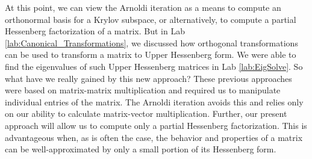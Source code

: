 At this point, we can view the Arnoldi iteration as a means to compute an orthonormal basis for a Krylov subspace, or 
alternatively, to compute a partial Hessenberg factorization of a matrix. 
But in Lab \ref{lab:Canonical_Transformations}, we discussed how orthogonal transformations can be used to transform a matrix to Upper
Hessenberg form.
We were able to find the eigenvalues of such Upper Hessenberg matrices in Lab \ref{lab:EigSolve}.
So what have we really gained by this new approach?
These previous approaches were based on matrix-matrix multiplication and required us to manipulate individual entries of the matrix.
The Arnoldi iteration avoids this and relies only on our ability to calculate matrix-vector multiplication.
Further, our present approach will allow us to compute only a partial Hessenberg factorization. This is advantageous when, as
is often the case, the behavior and properties of a matrix can be well-approximated by only a small portion of its Hessenberg
form.


